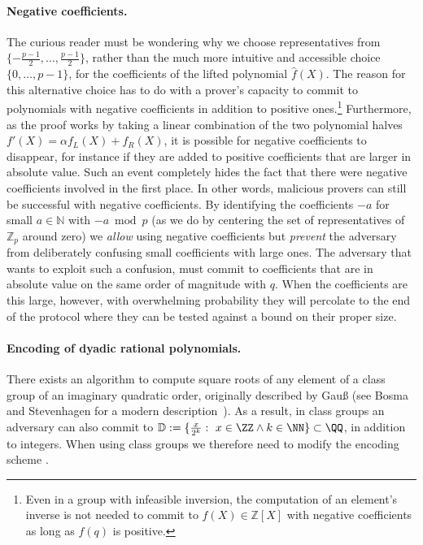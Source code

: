\paragraph{Negative coefficients.}
The curious reader must be wondering why we choose representatives from $\{-\frac{p-1}{2}, \ldots, \frac{p-1}{2}\}$, rather than the much more intuitive and accessible choice $\{0, \ldots, p-1\}$, for the coefficients of the lifted polynomial $\hat{f}(X)$. The reason for this alternative choice has to do with a prover's capacity to commit to polynomials with negative coefficients in addition to positive ones.\footnote{Even in a group with infeasible inversion, the computation of an element's inverse is not needed to commit to $f(X) \in \mathbb{Z}[X]$ with negative coefficients as long as $f(q)$ is positive.} Furthermore, as the proof works by taking a linear combination of the two polynomial halves $f'(X) = \alpha f_L(X) + f_R(X)$, it is possible for negative coefficients to disappear, for instance if they are added to positive coefficients that are larger in absolute value. Such an event completely hides the fact that there were negative coefficients involved in the first place. In other words, malicious provers can still be successful with negative coefficients. By identifying the coefficients $-a$ for small $a \in \mathbb{N}$ with $-a \bmod p$ (as we do by centering the set of representatives of $\mathbb{Z}_p$ around zero) we \emph{allow} using negative coefficients but \emph{prevent} the adversary from deliberately confusing small coefficients with large ones. The adversary that wants to exploit such a confusion, must commit to coefficients that are in absolute value on the same order of magnitude with $q$. When the coefficients are this large, however, with overwhelming probability they will percolate to the end of the protocol where they can be tested against a bound on their proper size.

\paragraph{Encoding of dyadic rational polynomials.}
There exists an algorithm to compute square roots of any element of a class group of an imaginary quadratic order, originally described by Gauß (see Bosma and Stevenhagen for a modern description~\cite{jtn/BosSte96}). As a result, in class groups an adversary can also commit to  $\mathbb{D}:=\{\frac{x}{2^k} : \ x \in \ZZ \wedge k \in \NN\}\subset \QQ$, in addition to integers. When using class groups we therefore need to modify the encoding scheme . 

